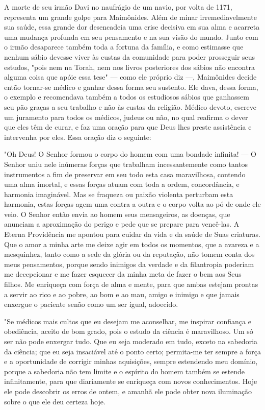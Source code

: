 A morte de seu irmão Davi no naufrágio de um navio, por volta de 1171,
representa um grande golpe para Maimônides. Além de minar
irremedia­velmente sua saúde, essa grande dor desencadeia uma crise
decisiva em sua al­ma e acarreta uma mudança profunda em seu pensamento
e na sua visão do
mundo. Junto com o irmão desaparece também toda a fortuna da família, e
co­mo estimasse que nenhum sábio devesse viver às custas da comunidade
para poder prosseguir seus estudos, "pois nem na Torah, nem nos livros
posterio­res dos sábios não encontra alguma coisa que apóie essa tese"
--- como ele pró­prio diz ---, Maimônides decide então tornar-se médico
e ganhar dessa forma seu sustento. Ele dava, dessa forma, o exemplo e
recomendava também a to­dos os estudiosos sábios que ganhassem seu pão
graças a seu trabalho e não às custas da religião. Médico devoto,
escreve um juramento para todos os mé­dicos, judeus ou não, no qual
reafirma o dever que eles têm de curar, e faz uma oração para que Deus
lhes preste assistência e intervenha por eles. Essa oração diz o
seguinte:

"Oh Deus! O Senhor formou o corpo do homem com uma bonda­de infinita!
--- O Senhor uniu nele inúmeras forças que trabalham incessante­mente
como tantos instrumentos a fim de preservar em seu todo esta casa
ma­ravilhosa, contendo uma alma imortal, e essas forças atuam com toda a
ordem, concordância, e harmonia imaginável. Mas se fraqueza ou paixão
violenta per­turbam esta harmonia, estas forças agem uma contra a outra
e o corpo volta ao pó de onde ele veio. O Senhor então envia ao homem
seus mensageiros, as doenças, que anunciam a aproximação do perigo e
pede que se prepare para vencê-las. A Eterna Providência me apontou para
cuidar da vida e da saúde de Suas criaturas. Que o amor a minha arte me
deixe agir em todos os momentos, que a avareza e a mesquinhez, tanto
como a sede da glória ou da reputação, não tomem conta dos meus
pensamentos, porque sendo inimigos da verdade e da filantropia poderiam
me decepcionar e me fazer esquecer da minha meta de fazer o bem aos Seus
filhos. Me enriqueça com força de alma e mente, para que ambas estejam
prontas a servir ao rico e ao pobre, ao bom e ao mau, amigo e inimigo e
que jamais enxergue o paciente senão como um ser igual, adoecido.

"Se médicos mais cultos que eu desejam me aconselhar, me inspirar
confiança e obediência, aceito de bom grado, pois o estudo da ciência é
mara­vilhoso. Um só ser não pode enxergar tudo. Que eu seja moderado em
tudo, exceto na sabedoria da ciência; que eu seja insaciável até o ponto
certo; permi­ta-me ter sempre a força e a oportunidade de corrigir
minhas aquisições, sem­pre estendendo meu domínio, porque a sabedoria
não tem limite e o espírito do homem também se estende infinitamente,
para que diariamente se enrique­ça com novos conhecimentos. Hoje ele
pode descobrir os erros de ontem, e amanhã ele pode obter nova
iluminação sobre o que ele deu certeza hoje.

